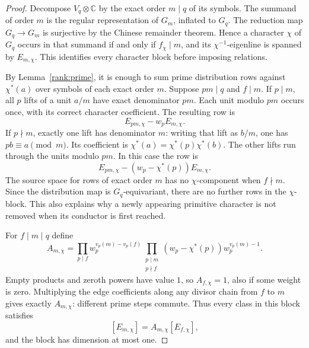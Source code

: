 \documentclass[11pt,a4paper]{article}
\theoremstyle{definition}
\theoremstyle{remark}
\numberwithin{equation}{section}
\begin{document}
\begin{proof}
Decompose $V_q\otimes\mathbb C$ by the exact order $m\mid q$ of its
symbols.  The summand of order $m$ is the regular representation of
$G_m$, inflated to $G_q$.  The reduction map $G_q\to G_m$ is surjective
by the Chinese remainder theorem.  Hence a character $\chi$ of $G_q$
occurs in that summand if and only if $f_\chi\mid m$, and its
$\chi^{-1}$-eigenline is spanned by $E_{m,\chi}$.  This identifies every
character block before imposing relations.

By Lemma~\ref{rank:prime}, it is enough to sum prime distribution rows
against $\chi^*(a)$ over symbols of each exact order $m$.  Suppose
$pm\mid q$ and $f\mid m$.  If $p\mid m$, all $p$ lifts of a unit
$a/m$ have exact denominator $pm$.  Each unit modulo $pm$ occurs once,
with its correct character coefficient.  The resulting row is
\begin{equation}\label{rank:edge-ramified}
 E_{pm,\chi}-w_p E_{m,\chi}.
\end{equation}
If $p\nmid m$, exactly one lift has denominator $m$: writing that lift
as $b/m$, one has $pb\equiv a\pmod m$.  Its coefficient is
$\chi^*(a)=\chi^*(p)\chi^*(b)$.  The other lifts run through the units
modulo $pm$.  In this case the row is
\begin{equation}\label{rank:edge-unramified}
 E_{pm,\chi}-(w_p-\chi^*(p))E_{m,\chi}.
\end{equation}
The source space for rows of exact order $m$ has no $\chi$-component
when $f\nmid m$.  Since the distribution map is $G_q$-equivariant,
there are no further rows in the $\chi$-block.  This also explains why
a newly appearing primitive character is not removed when its conductor
is first reached.

For $f\mid m\mid q$ define
\begin{equation}\label{rank:A}
 A_{m,\chi}=
 \prod_{p\mid f}w_p^{v_p(m)-v_p(f)}
 \prod_{\substack{p\mid m\\p\nmid f}}
       (w_p-\chi^*(p))w_p^{v_p(m)-1}.
\end{equation}
Empty products and zeroth powers have value $1$, so $A_{f,\chi}=1$,
also if some weight is zero.  Multiplying the edge coefficients along
any divisor chain from $f$ to $m$ gives exactly $A_{m,\chi}$:
different prime steps commute.  Thus every class in this block satisfies
\begin{equation}\label{rank:transport}
 [E_{m,\chi}]=A_{m,\chi}[E_{f,\chi}],
\end{equation}
and the block has dimension at most one.


\end{proof}
\end{document}
